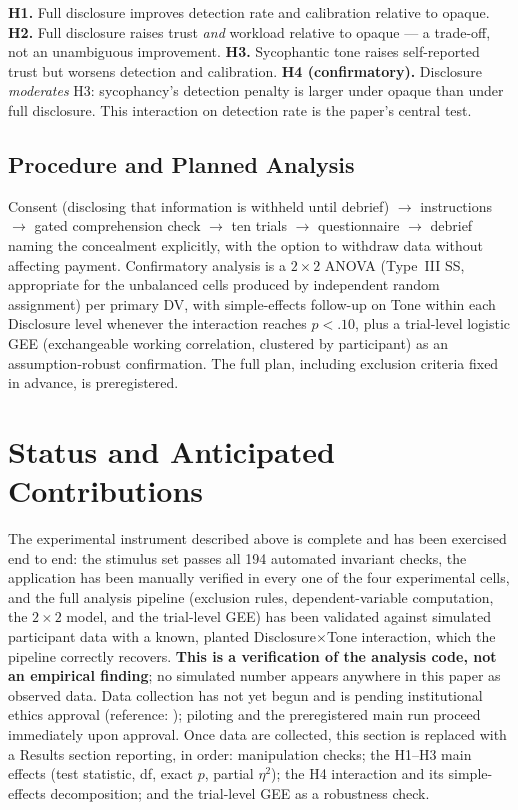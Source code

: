 \documentclass[manuscript]{acmart}
\begin{document}
\textbf{H1.} Full disclosure improves detection rate and calibration relative to opaque.
\textbf{H2.} Full disclosure raises trust \emph{and} workload relative to opaque --- a trade-off, not an unambiguous improvement.
\textbf{H3.} Sycophantic tone raises self-reported trust but worsens detection and calibration.
\textbf{H4 (confirmatory).} Disclosure \emph{moderates} H3: sycophancy's detection penalty is larger under opaque than under full disclosure. This interaction on detection rate is the paper's central test.

\subsection{Procedure and Planned Analysis}
Consent (disclosing that information is withheld until debrief) $\rightarrow$ instructions $\rightarrow$ gated comprehension check $\rightarrow$ ten trials $\rightarrow$ questionnaire $\rightarrow$ debrief naming the concealment explicitly, with the option to withdraw data without affecting payment. Confirmatory analysis is a $2\times2$ ANOVA (Type~III SS, appropriate for the unbalanced cells produced by independent random assignment) per primary DV, with simple-effects follow-up on Tone within each Disclosure level whenever the interaction reaches $p<.10$, plus a trial-level logistic GEE (exchangeable working correlation, clustered by participant) as an assumption-robust confirmation. The full plan, including exclusion criteria fixed in advance, is preregistered.

\section{Status and Anticipated Contributions}
\label{sec:status}

The experimental instrument described above is complete and has been exercised end to end: the stimulus set passes all 194 automated invariant checks, the application has been manually verified in every one of the four experimental cells, and the full analysis pipeline (exclusion rules, dependent-variable computation, the $2\times2$ model, and the trial-level GEE) has been validated against simulated participant data with a known, planted Disclosure$\times$Tone interaction, which the pipeline correctly recovers. \textbf{This is a verification of the analysis code, not an empirical finding}; no simulated number appears anywhere in this paper as observed data. Data collection has not yet begun and is pending institutional ethics approval (reference: \ethicsref); piloting and the preregistered main run proceed immediately upon approval. Once data are collected, this section is replaced with a Results section reporting, in order: manipulation checks; the H1--H3 main effects (test statistic, df, exact $p$, partial $\eta^2$); the H4 interaction and its simple-effects decomposition; and the trial-level GEE as a robustness check.
\end{document}
